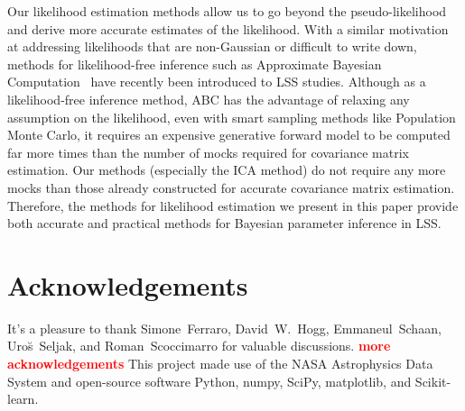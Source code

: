\documentclass[12pt, letterpaper, preprint]{aastex}
\newcommand{\todo}[1]{{\bf \textcolor{red}{#1}}}
\begin{document}
Our likelihood estimation methods allow us to go beyond the pseudo-likelihood 
and derive more accurate estimates of the likelihood. With a similar 
motivation at addressing likelihoods that are non-Gaussian or difficult to 
write down, methods for likelihood-free inference such as Approximate Bayesian 
Computation~\citep[ABC;][]{hahn2017a,kacprzak2017,alsing2017} have recently 
been introduced to LSS studies. 
Although as a likelihood-free inference method, ABC has the advantage 
of relaxing any assumption on the likelihood, even with smart sampling methods 
like Population Monte Carlo, it requires an expensive generative forward 
model to be computed far more times than the number of mocks required for 
covariance matrix estimation. Our methods (especially the ICA method)
do not require any more mocks than those already constructed for accurate covariance 
matrix estimation. Therefore, the methods for likelihood estimation we present
in this paper provide both accurate and practical methods for Bayesian 
parameter inference in LSS. 

\section*{Acknowledgements}
It's a pleasure to thank 
    Simone~Ferraro,
    David~W.~Hogg,
    Emmaneul~Schaan, 
    Uro{\u s}~Seljak,
    and Roman~Scoccimarro 
for valuable discussions.
\todo{more acknowledgements}
This project made use of the NASA Astrophysics Data System
and open-source software Python, numpy, SciPy, matplotlib, 
and Scikit-learn.



\end{document}
